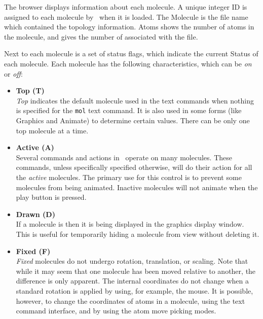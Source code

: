 The browser displays information about each molecule.  A unique integer ID
is assigned to each molecule by \VMD\ when it is loaded.  The {\sf Molecule}
is the file name which contained the topology information.  {\sf Atoms}
shows the number of atoms in the molecule, and 
gives the number of \timesteps associated with the file.

Next to each molecule is a set of status flags, which indicate the current
{\sf Status} of each molecule.  Each molecule has the following
characteristics, which can be {\em on} or {\em off}:
\begin{itemize}

  \item {\bf Top (T)} \\
{\em Top} indicates the
default molecule used in the text commands when nothing is specified
for the {\tt mol} text command.  It is also used in some forms (like
Graphics and Animate) to determine certain values.  There can be only
one top molecule at a time.

  \item {\bf Active (A)} \\
Several commands and actions in \VMD\ operate on many molecules.
These commands, unless specifically specified otherwise, will do their
action for all the {\em active} molecules.  The primary use for this
control is to prevent some molecules from being animated.  Inactive
molecules will not animate when the play button is pressed.

  \item {\bf Drawn (D)} \\
If a molecule is  then it is being displayed
in the graphics display window.  This is useful for
temporarily hiding a molecule from view without deleting it.

  \item {\bf Fixed (F)} \\
{\em  Fixed} molecules do not undergo rotation,
translation, or scaling.  Note that while it may seem that one
molecule has been moved relative to another, the difference is only
apparent.  The internal coordinates do not change when a standard rotation
is applied by using, for example, the mouse.  It is possible, however, to
change the coordinates of atoms in a molecule, using the text command
interface, and by using the atom move picking modes.

\end{itemize}


